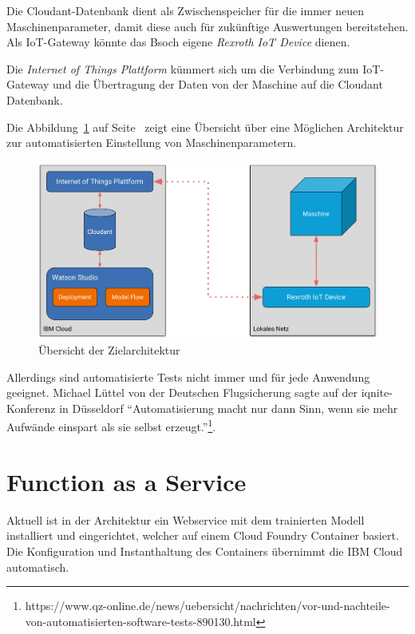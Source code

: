 Die Cloudant-Datenbank dient als Zwischenspeicher für die immer neuen Maschinenparameter, damit diese auch für
zukünftige Auswertungen bereitstehen. Als IoT-Gateway könnte das Bsoch eigene \textit{Rexroth IoT Device} dienen.

Die \textit{Internet of Things Plattform} kümmert sich um die Verbindung zum IoT-Gateway und die Übertragung der Daten
von der Maschine auf die Cloudant Datenbank.

Die Abbildung~\ref{fig:ausblick_uebersicht} auf Seite~\pageref{fig:ausblick_uebersicht} zeigt eine Übersicht über eine
Möglichen Architektur zur automatisierten Einstellung von Maschinenparametern.

\begin{figure}[h]
    \centering
    \includegraphics[width=\textwidth]{images/kapitel_6/architektur_uebersicht.pdf}
    \caption{Übersicht der Zielarchitektur}
    \label{fig:ausblick_uebersicht}
\end{figure}

Allerdings sind automatisierte Tests nicht immer und für jede Anwendung geeignet. Michael Lüttel von der Deutschen
Flugsicherung sagte auf der iqnite-Konferenz in Düsseldorf \enquote{Automatisierung macht nur dann Sinn, wenn sie mehr
Aufwände einspart als sie selbst
erzeugt.}\footnote{https://www.qz-online.de/news/uebersicht/nachrichten/vor-und-nachteile-von-automatisierten-software-tests-890130.html}.

\section{Function as a Service}
Aktuell ist in der Architektur ein Webservice mit dem trainierten Modell installiert und eingerichtet, welcher auf
einem Cloud Foundry Container basiert. Die Konfiguration und Instanthaltung des Containers übernimmt die IBM Cloud
automatisch.

